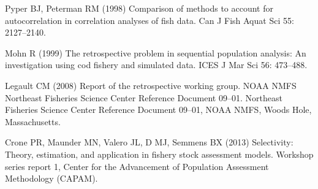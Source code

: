 \documentclass[12pt]{article}
\begin{document}
\begin{thebibliography}{10}
Pyper BJ, Peterman RM (1998) Comparison of methods to account for
  autocorrelation in correlation analyses of fish data.
\newblock Can J Fish Aquat Sci 55: 2127--2140.

Mohn R (1999) The retrospective problem in sequential population analysis: An
  investigation using cod fishery and simulated data.
\newblock ICES J Mar Sci 56: 473--488.

Legault CM (2008) Report of the retrospective working group. {NOAA NMFS
  Northeast Fisheries Science Center Reference Document} 09--01.
\newblock Northeast Fisheries Science Center Reference Document 09--01, NOAA
  NMFS, Woods Hole, Massachusetts.

Crone PR, Maunder MN, Valero JL, D MJ, Semmens BX (2013) Selectivity: Theory,
  estimation, and application in fishery stock assessment models.
\newblock Workshop series report 1, Center for the Advancement of Population
  Assessment Methodology (CAPAM).

\end{thebibliography}
\end{document}
